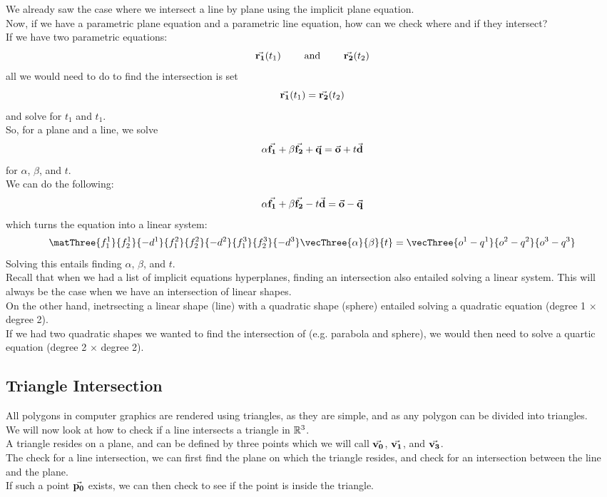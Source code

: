 \documentclass[12pt]{article}
\begin{document}
We already saw the case where we intersect
a line by plane using the implicit plane
equation. \\
Now, if we have a parametric plane equation
and a parametric line equation,
how can we check where and if they intersect? \\
If we have two parametric equations:
\[ \vec{\mathbf{r_1}}(t_1) \qquad \text{ and }
\qquad \vec{\mathbf{r_2}}(t_2) \]
all we would need to do to find the intersection
is set
\[ \vec{\mathbf{r_1}}(t_1) = \vec{\mathbf{r_2}}(t_2) \]
and solve for $t_1$ and $t_1$. \\
So, for a plane and a line, we solve
\[ \alpha \vec{\mathbf{f_1}} + \beta \vec{\mathbf{f_2}} + \vec{\mathbf{q}}
= \vec{\mathbf{o}} + t\vec{\mathbf{d}} \]
for $\alpha$, $\beta$, and $t$. \\
We can do the following:
\[ \alpha \vec{\mathbf{f_1}} + \beta \vec{\mathbf{f_2}} - t\vec{\mathbf{d}}
= \vec{\mathbf{o}} - \vec{\mathbf{q}} \]
which turns the equation into a linear system:
\[ 
    \matThree{f_1^1}{f_2^1}{-d^1}
    {f_1^2 }{f_2^2}{-d^2}
    {f_1^3}{f_2^3}{-d^3}
    \vecThree{\alpha}{\beta}{t}
    = \vecThree{o^1 - q^1}{o^2 - q^2}{o^3 - q^3} 
\]
Solving this entails finding
$\alpha$, $\beta$, and $t$. \\

Recall that when we had a list of implicit equations
hyperplanes,
finding an intersection also entailed
solving a linear system.
This will always be the case when we have
an intersection of linear shapes. \\
On the other hand, inetrsecting a linear shape
(line) with a quadratic shape (sphere)
entailed solving a quadratic equation
(degree 1 $\times$ degree 2). \\
If we had two quadratic shapes we wanted to 
find the intersection of (e.g. parabola and sphere),
we would then need to solve a quartic equation
(degree 2 $\times$ degree 2). \\

\newpage

\subsection*{Triangle Intersection}

All polygons in computer graphics are
rendered using triangles,
as they are simple,
and as any polygon can be divided into triangles. \\

We will now look at how to check if a line
intersects a triangle in $\mathbb{R}^3$. \\

A triangle resides on a plane,
and can be defined by three points
which we will call $\vec{\mathbf{v_0}}$, $\vec{\mathbf{v_1}}$,
and $\vec{\mathbf{v_3}}$. \\
The check for a line intersection,
we can first find the plane on which the triangle
resides,
and check for an intersection between the line
and the plane. \\
If such a point $\vec{\mathbf{p_0}}$ exists,
we can then check to see if the point is
inside the triangle. \\
\end{document}
